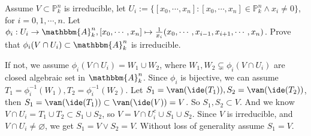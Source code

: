 \documentclass{ctexart}
\newif\ifpreface
\begin{document}
\large
\setlength{\baselineskip}{1.2em}
\ifpreface
    
\newgeometry{left=2cm,right=2cm,top=2cm,bottom=2cm}
\else
{}
\maketitle
\fi
\begin{problem}
  Assume \(V \subset \mathbb{P}_k^{n}\) is irreducible, let \(U_i:=\{[x_0,\cdots,x_n]:[x_0,\cdots,x_n] \in \mathbb{P}_k^n \wedge x_i \neq 0\}\), for \(i=0,1,\cdots,n\). 
  Let \(\phi_i:U_i \to \mathbbm{A}_k^n,[x_0,\cdots,x_n] \mapsto \frac{1}{x_i}(x_0,\cdots,x_{i-1},x_{i+1},\cdots,x_n)\). 
  Prove that \(\phi_i(V \cap U_i) \subset \mathbbm{A}_k^n\) is irreducible. 
\end{problem}

\begin{solution}
  If not, we assume \(\phi_i(V \cap U_i)=W_1 \cup W_2\), where \(W_1,W_2 \subsetneq \phi_i(V \cap U_i)\) are closed algebraic set in \(\mathbbm{A}_k^n\). 
  Since \(\phi_i\) is bijective, we can assume \(T_1=\phi_i^{-1}(W_1),T_2=\phi_i^{-1}(W_2)\). 
  Let \(S_1=\van(\ide(T_1)), S_2=\van(\ide(T_2))\), then \(S_1=\van(\ide(T_1)) \subset \van(\ide(V))=V\). So \(S_1,S_2 \subset V\). 
  And we know \(V \cap U_i=T_1 \cup T_2 \subset S_1 \cup S_2\), so \(V=V \cap U_i^c \cup S_1 \cup S_2\). 
  Since \(V\) is irreducible, and \(V \cap U_i \neq \varnothing\), we get \(S_1=V \vee S_2=V\). 
  Without loss of generality assume \(S_1=V\). 
\end{solution}
\end{document}
